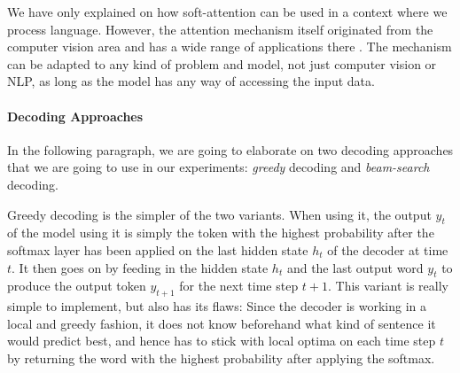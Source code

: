 We have only explained on how soft-attention can be used in a context where we process language. However, the attention mechanism itself originated from the computer vision area \cite{Desimone:1995}\cite{Itti:1998}\cite{Mnih:2014} and has a wide range of applications there \cite{Gregor:2015}\cite{Xu:2015}\cite{Cho:2015}. The mechanism can be adapted to any kind of problem and model, not just computer vision or NLP, as long as the model has any way of accessing the input data.

\paragraph{Decoding Approaches}
\label{fundamentals:decoding_approaches}
In the following paragraph, we are going to elaborate on two decoding approaches that we are going to use in our experiments: \emph{greedy} decoding and \emph{beam-search} decoding.

Greedy decoding is the simpler of the two variants. When using it, the output $y_t$ of the model using it is simply the token with the highest probability after the softmax layer has been applied on the last hidden state $h_t$ of the decoder at time $t$. It then goes on by feeding in the hidden state $h_t$ and the last output word $y_t$ to produce the output token $y_{t+1}$ for the next time step $t+1$. This variant is really simple to implement, but also has its flaws: Since the decoder is working in a local and greedy fashion, it does not know beforehand what kind of sentence it would predict best, and hence has to stick with local optima on each time step $t$ by returning the word with the highest probability after applying the softmax.

